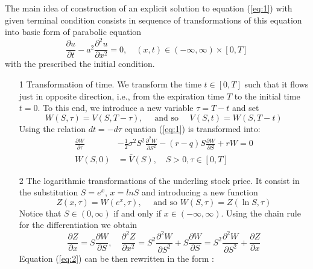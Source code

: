 \documentclass[a4paper]{article}
\begin{document}
The main idea of construction of an explicit solution to equation (\ref{eq:1}) with given terminal condition consists in sequence of transformations of this 
equation into basic form of parabolic equation
\begin{equation}
    \frac{\partial u}{\partial t}-a^{2} \frac{\partial^{2} u}{\partial x^{2}}=0, \quad(x, t) \in(-\infty, \infty) \times[0, T]
\end{equation}
with the prescribed the initial condition.
\par 
\begin{itemize}
    \item[1] Transformation of time. We transform the time $t \in [0, T]$ such that it flows just in opposite direction, i.e., from the expiration time $T$ to the initial time $t=0$. To this end, we introduce
a new variable $\tau = T -t$ and set
\begin{equation}
    W(S, \tau)=V(S, T-\tau), \quad \text { and so } \quad V(S, t)=W(S, T-t)
\end{equation}
Using the relation $dt = -d\tau $ equation (\ref{eq:1}) is transformed into:
\begin{equation}
    \begin{aligned}
    \frac{\partial W}{\partial \tau} &-\frac{1}{2} \sigma^{2} S^{2} \frac{\partial^{2} W}{\partial S^{2}}-(r-q) S \frac{\partial W}{\partial S}+r W=0 \\
    W(S, 0) &=\bar{V}(S), \quad S>0, \tau \in[0, T]
    \end{aligned}
    \label{eq:2}
\end{equation}
    \item[2] The logarithmic transformations of the underling stock price. It consist in the substitution $S = e^x$, $x = ln S$ and introducing a new function
    \begin{equation}
        Z(x, \tau)=W\left(e^{x}, \tau\right), \quad \text { and so } W(S, \tau)=Z(\ln S, \tau)
    \end{equation}
Notice that $S \in (0, \infty)$ if and only if $x \in (-\infty, \infty)$. Using the chain rule for the differentiation we obtain
\begin{equation}
    \frac{\partial Z}{\partial x}=S \frac{\partial W}{\partial S}, \quad \frac{\partial^{2} Z}{\partial x^{2}}=S^{2} \frac{\partial^{2} W}{\partial S^{2}}+S \frac{\partial W}{\partial S}=S^{2} \frac{\partial^{2} W}{\partial S^{2}}+\frac{\partial Z}{\partial x}
\end{equation}
Equation (\ref{eq:2}) can be then rewritten in the form :

\end{itemize}
\end{document}
